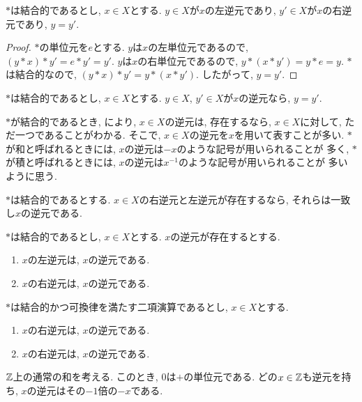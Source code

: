 \begin{lemma}
  $\ast$は結合的であるとし,
  $x\in X$とする.
  $y\in X$が$x$の左逆元であり,
  $y'\in X$が$x$の右逆元であり,
  $y=y'$.
\end{lemma}
\begin{proof}
  $\ast$の単位元を$e$とする.
  $y$は$x$の左単位元であるので,
  $(y\ast x) \ast y'=e\ast y'=y'$.
  $y$は$x$の右単位元であるので,
  $y\ast (x \ast y')=y\ast e=y$.
  $\ast$は結合的なので,
  $(y\ast x) \ast y'=y\ast (x \ast y')$.
  したがって, $y=y'$.
\end{proof}
\begin{cor}
\label{cor:uniq:inv}
  $\ast$は結合的であるとし,
  $x\in X$とする.
  $y\in X$, $y'\in X$が$x$の逆元なら,
  $y=y'$.
\end{cor}
\begin{remark}
  $\ast$が結合的であるとき,
  により,
  $x\in X$の逆元は, 存在するなら, $x\in X$に対して,
  ただ一つであることがわかる.
  そこで, $x\in X$の逆元を$x$を用いて表すことが多い.
  $\ast$が和と呼ばれるときには,
  $x$の逆元は$-x$のような記号が用いられることが
  多く,
  $\ast$が積と呼ばれるときには, 
  $x$の逆元は$x^{-1}$のような記号が用いられることが
  多いように思う.
\end{remark}
\begin{cor}
  $\ast$は結合的であるとする.
  $x\in X$の右逆元と左逆元が存在するなら,
  それらは一致し$x$の逆元である.
\end{cor}
\begin{cor}
  $\ast$は結合的であるとし,
  $x\in X$とする.
  $x$の逆元が存在するとする.
  \begin{enumerate}
  \item $x$の左逆元は, $x$の逆元である.
  \item $x$の右逆元は, $x$の逆元である.
  \end{enumerate}
\end{cor}
\begin{cor}
  $\ast$は結合的かつ可換律を満たす二項演算であるとし,
  $x\in X$とする.
  \begin{enumerate}
  \item $x$の右逆元は, $x$の逆元である.
  \item $x$の右逆元は, $x$の逆元である.
  \end{enumerate}
\end{cor}
\begin{example}
  $\mathbb{Z}$上の通常の和を考える.
  このとき, $0$は$+$の単位元である.
  どの$x\in \mathbb{Z}$も逆元を持ち,
  $x$の逆元はその$-1$倍の$-x$である.
\end{example}
